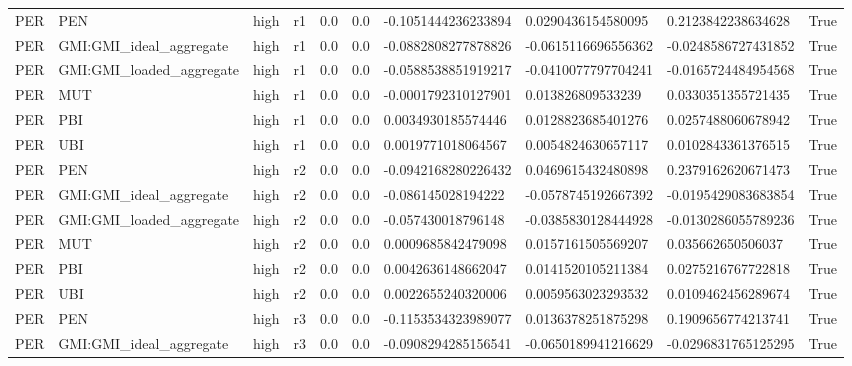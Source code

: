 \begin{table}[!htbp]
\begin{tabular}{llllllllll}
PER & PEN & high & r1 & 0.0 & 0.0 & -0.1051444236233894 & 0.0290436154580095 & 0.2123842238634628 & True \\
PER & GMI:GMI\_ideal\_aggregate & high & r1 & 0.0 & 0.0 & -0.0882808277878826 & -0.0615116696556362 & -0.0248586727431852 & True \\
PER & GMI:GMI\_loaded\_aggregate & high & r1 & 0.0 & 0.0 & -0.0588538851919217 & -0.0410077797704241 & -0.0165724484954568 & True \\
PER & MUT & high & r1 & 0.0 & 0.0 & -0.0001792310127901 & 0.013826809533239 & 0.0330351355721435 & True \\
PER & PBI & high & r1 & 0.0 & 0.0 & 0.0034930185574446 & 0.0128823685401276 & 0.0257488060678942 & True \\
PER & UBI & high & r1 & 0.0 & 0.0 & 0.0019771018064567 & 0.0054824630657117 & 0.0102843361376515 & True \\
PER & PEN & high & r2 & 0.0 & 0.0 & -0.0942168280226432 & 0.0469615432480898 & 0.2379162620671473 & True \\
PER & GMI:GMI\_ideal\_aggregate & high & r2 & 0.0 & 0.0 & -0.086145028194222 & -0.0578745192667392 & -0.0195429083683854 & True \\
PER & GMI:GMI\_loaded\_aggregate & high & r2 & 0.0 & 0.0 & -0.057430018796148 & -0.0385830128444928 & -0.0130286055789236 & True \\
PER & MUT & high & r2 & 0.0 & 0.0 & 0.0009685842479098 & 0.0157161505569207 & 0.035662650506037 & True \\
PER & PBI & high & r2 & 0.0 & 0.0 & 0.0042636148662047 & 0.0141520105211384 & 0.0275216767722818 & True \\
PER & UBI & high & r2 & 0.0 & 0.0 & 0.0022655240320006 & 0.0059563023293532 & 0.0109462456289674 & True \\
PER & PEN & high & r3 & 0.0 & 0.0 & -0.1153534323989077 & 0.0136378251875298 & 0.1909656774213741 & True \\
PER & GMI:GMI\_ideal\_aggregate & high & r3 & 0.0 & 0.0 & -0.0908294285156541 & -0.0650189941216629 & -0.0296831765125295 & True \\
\bottomrule
\end{tabular}
\end{table}

